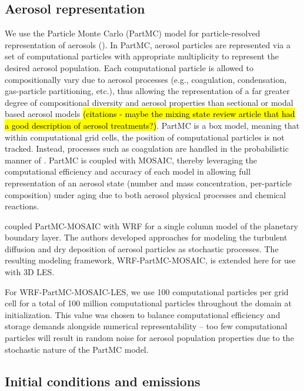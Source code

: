 \subsection{Aerosol representation}

We use the Particle Monte Carlo (PartMC) model for particle-resolved representation of aerosols (\cite{riemer_simulating_2009}). In PartMC, aerosol particles are represented via a set of computational particles with appropriate multiplicity to represent the desired aerosol population. Each computational particle is allowed to compositionally vary due to aerosol processes (e.g., coagulation, condensation, gas-particle partitioning, etc.), thus allowing the representation of a far greater degree of compositional diversity and aerosol properties than sectional or modal based aerosol models \hl{(citations - maybe the mixing state review article that had a good description of aerosol treatments?)}. PartMC is a box model, meaning that within computational grid cells, the position of computational particles is not tracked. Instead, processes such as coagulation are handled in the probabilistic manner of \cite{gillespie_exact_1975}. PartMC is coupled with MOSAIC, thereby leveraging the computational efficiency and accuracy of each model in allowing full representation of an aerosol state (number and mass concentration, per-particle composition) under aging due to both aerosol physical processes and chemical reactions.

\cite{curtis_single-column_2017} coupled PartMC-MOSAIC with WRF for a single column model of the planetary boundary layer. The authors developed approaches for modeling the turbulent diffusion and dry deposition of aerosol particles as stochastic processes. The resulting modeling framework, WRF-PartMC-MOSAIC, is extended here for use with 3D LES. 

For WRF-PartMC-MOSAIC-LES, we use 100 computational particles per grid cell for a total of 100 million computational particles throughout the domain at initialization. This value was chosen to balance computational efficiency and storage demands alongside numerical representability -- too few computational particles will result in random noise for aerosol population properties due to the stochastic nature of the PartMC model.

\subsection{Initial conditions and emissions}

